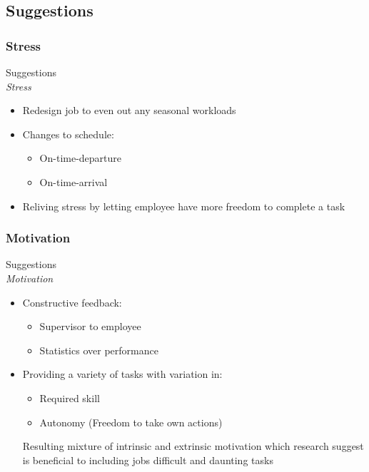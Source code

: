 \subsection{Suggestions}
\subsubsection{Stress}
\begin{frame}{Suggestions\\\textit{Stress}}{}
    \begin{itemize}
        \item Redesign job to even out any seasonal workloads
        \item Changes to schedule:
            \begin{itemize}
                \item On-time-departure
                \item On-time-arrival
            \end{itemize}
        \item Reliving stress by letting employee have more freedom to complete a task
    \end{itemize}
\end{frame}

\subsubsection{Motivation}
\begin{frame}{Suggestions\\\textit{Motivation}}{}
    \begin{itemize}
        \item Constructive feedback:
            \begin{itemize}
                \item Supervisor to employee
                \item Statistics over performance
            \end{itemize}
        \item Providing a variety of tasks with variation in:
            \begin{itemize}
                \item Required skill
                \item Autonomy (Freedom to take own actions)
            \end{itemize}
                        Resulting mixture of intrinsic and extrinsic motivation which research suggest is beneficial to including jobs difficult and daunting tasks
    \end{itemize}
\end{frame}